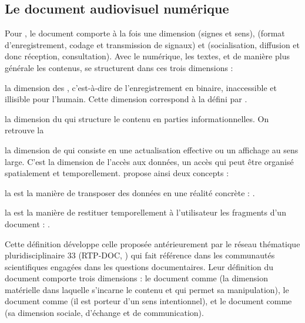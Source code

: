 
\subsection{Le document audiovisuel numérique}
Pour \cite{Leleu-Merviel2004}, le document comporte à la fois une dimension  (signes et sens),  (format d'enregistrement, codage et transmission de signaux) et  (socialisation, diffusion et donc réception, consultation).
Avec le numérique, les textes, et de manière plus générale les contenus, se structurent dans ces trois dimensions : 
\begin{listeni}
	\item la dimension  des , c'est-à-dire de l'enregistrement en binaire, inaccessible et illisible pour l'humain. 
	Cette dimension correspond à la   défini par \cite{bachimont:icc}. %
	
	\item la dimension  du  qui structure le contenu en parties informationnelles.  %
	On retrouve la 

	\item la dimension de  qui consiste en une actualisation effective ou un affichage au sens large. 
	C'est la dimension de l'accès aux données, un accès qui peut être organisé spatialement et temporellement. \cite{Leleu-Merviel2005} propose ainsi deux concepts : 
	\begin{liste}
		\item la  est la manière de transposer des données en une réalité concrète : . %
		\item la  est la manière de restituer temporellement à l'utilisateur les fragments d'un document : . %
	\end{liste}
\end{listeni}

Cette définition développe celle proposée antérieurement par le réseau thématique pluridisciplinaire 33 (RTP-DOC, \cite{Pedauque2003}) qui fait référence dans les communautés scientifiques engagées dans les questions documentaires.
Leur définition du document comporte trois dimensions : le document comme  (la dimension matérielle dans laquelle s’incarne le contenu et qui permet sa manipulation), le document comme  (il est porteur d’un sens intentionnel), et le document comme  (sa dimension sociale, d'échange et de communication). 


